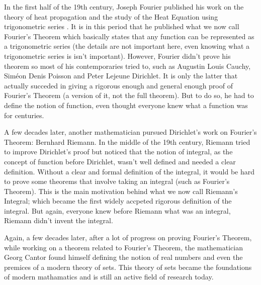 \documentclass[10pt]{article}
\theoremstyle{definition}
\begin{document}

In the first half of the 19th century, Joseph Fourier published his work on the theory of heat propagation and the study of the Heat Equation using trigonometric series \cite{fourier1822}. It is in this period that he published what we now call Fourier's Theorem which basically states that any function can be represented as a trigonometric series (the details are not important here, even knowing what a trigonometric series is isn't important). However, Fourier didn't prove his theorem so most of his contemporaries tried to, such as Augustin Louis Cauchy, Siméon Denis Poisson and Peter Lejeune Dirichlet. It is only the latter that actually succeded in giving a rigorous enough and general enough proof of Fourier's Theorem (a version of it, not the full theorem). But to do so, he had to define the notion of function, even thought everyone knew what a function was for centuries.

A few decades later, another mathematician pursued Dirichlet's work on Fourier's Theorem: Bernhard Riemann. In the middle of the 19th century, Riemann tried to improve Dirichlet's proof but noticed that the notion of integral, as the concept of function before Dirichlet, wasn't well defined and needed a clear definition. Without a clear and formal definition of the integral, it would be hard to prove some theorems that involve taking an integral (such as Fourier's Theorem). This is the main motivation behind what we now call Riemann's Integral; which became the first widely accpeted rigorous definition of the integral. But again, everyone knew before Riemann what was an integral, Riemann didn't invent the integral.

Again, a few decades later, after a lot of progress on proving Fourier's Theorem, while working on a theorem related to Fourier's Theorem, the mathematician Georg Cantor found himself defining the notion of real numbers and even the premices of a modern theory of sets. This theory of sets became the foundations of modern mathamatics and is still an active field of research today. 
\end{document}
